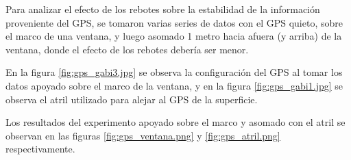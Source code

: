 \documentclass[spanish,12pt,a4paper,titlepage]{report}
\begin{document}
Para analizar el efecto de los rebotes sobre la estabilidad de la información proveniente del GPS, se tomaron varias series de datos con el GPS quieto, sobre el marco de una ventana, y luego asomado 1 metro hacia afuera (y arriba) de la ventana, donde el efecto de los rebotes debería ser menor.

En la figura \ref{fig:gps_gabi3.jpg} se observa la configuración del GPS al tomar los datos apoyado sobre el marco de la ventana, y en la figura \ref{fig:gps_gabi1.jpg} se observa el atril utilizado para alejar al GPS de la superficie.

\begin{figure}[h!]
  \begin{center}
\hspace{50pt}
  \end{center}
\end{figure}

Los resultados del experimento apoyado sobre el marco y asomado con el atril se observan en las figuras \ref{fig:gps_ventana.png} y \ref{fig:gps_atril.png} respectivamente.
\end{document}
